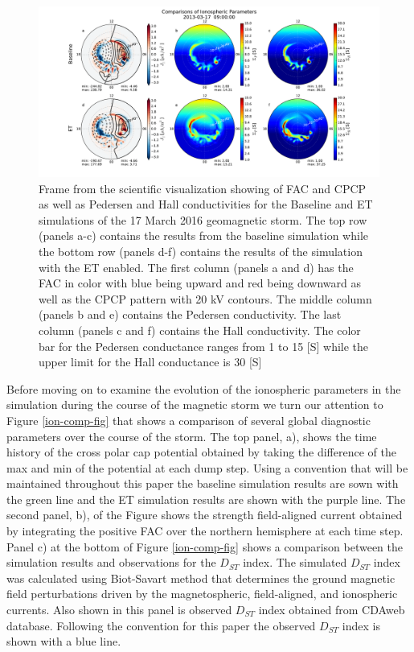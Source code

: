 \documentclass[draft,jgrga]{agutex}
\begin{document}
\begin{article}
\begin{figure}[t]
\noindent\includegraphics[width=39pc]{JGRPaper-IonPatterns.pdf}
\caption{\label{ion-pattern-fig}
Frame from the scientific visualization showing of FAC and CPCP as well as Pedersen and Hall conductivities for the Baseline and ET simulations of the 17 March 2016 geomagnetic storm.  The top row (panels a-c) contains the results from the baseline simulation while the bottom row (panels d-f) contains the results of the simulation with the ET enabled.  The first column (panels a and d) has the FAC in color with blue being upward and red being downward as well as the CPCP pattern with 20 kV contours.  The middle column (panels b and e) contains the Pedersen conductivity.  The last column (panels c and f) contains the Hall conductivity.  The color bar for the Pedersen conductance ranges from 1 to 15 [S] while the upper limit for the Hall conductance is 30 [S]}
\end{figure}

Before moving on to examine the evolution of the ionospheric parameters in the simulation during the course of the magnetic storm we turn our attention to Figure \ref{ion-comp-fig} that shows a comparison of several global diagnostic parameters over the course of the storm.  The top panel, a), shows the time history of the cross polar cap potential obtained by taking the difference of the max and min of the potential at each dump step.  Using a convention that will be maintained throughout this paper the baseline simulation results are sown with the green line and the ET simulation results are shown with the purple line.  The second panel, b), of the Figure shows the strength field-aligned current obtained by integrating the positive FAC over the northern hemisphere at each time step.  Panel c) at the bottom of Figure \ref{ion-comp-fig} shows a comparison between the simulation results and observations for the $D_{ST}$ index.  The simulated $D_{ST}$ index was calculated using Biot-Savart method that determines the ground magnetic field perturbations driven by the magnetospheric, field-aligned, and ionospheric currents.  Also shown in this panel is observed $D_{ST}$ index obtained from CDAweb database.   Following the convention for this paper the observed $D_{ST}$ index is shown with a blue line.


\end{article}
\end{document}
